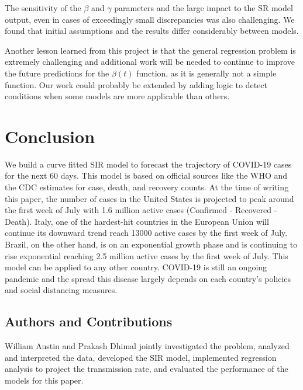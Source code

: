 \documentclass[11pt]{article}
\begin{document}
The sensitivity of the $\beta$ and $\gamma$ parameters and the large impact to the SR model output, even in cases of exceedingly small discrepancies was also challenging. We found that initial assumptions and the results differ considerably between models. 

Another lesson learned from this project is that the general regression problem is extremely challenging and additional work will be needed to continue to improve the future predictions for the $\beta(t)$ function, as it is generally not a simple function. Our work could probably be extended by adding logic to detect conditions when some models are more applicable than others. 

\section{Conclusion}
We build a curve fitted SIR model to forecast the trajectory of COVID-19 cases for the next 60 days. This model is based on official sources like the WHO and the CDC estimates for case, death, and recovery counts. At the time of writing this paper, the number of cases in the United States is projected to peak around the first week of July with 1.6 million active cases (Confirmed - Recovered - Death). Italy, one of the hardest-hit countries in the European Union will continue its downward trend reach 13000 active cases by the first week of July. Brazil, on the other hand, is on an exponential growth phase and is continuing to rise exponential reaching 2.5 million active cases by the first week of July. This model can be applied to any other country. COVID-19 is still an ongoing pandemic and the spread this disease largely depends on each country's policies and social distancing measures.


\subsection{Authors and Contributions}
William Austin and Prakash Dhimal jointly investigated the problem, analyzed and interpreted the data, developed the SIR model, implemented regression analysis to project the transmission rate, and evaluated the performance of the models for this paper.

\nocite{epidemic-calculator}





\pagebreak


\listoffigures



\end{document}
